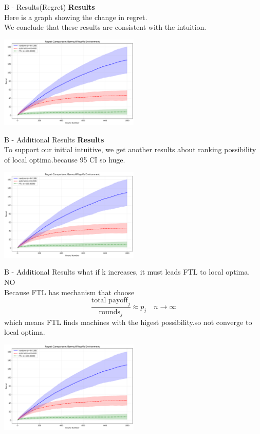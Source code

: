 \documentclass{beamer}
\begin{document}
\begin{frame}{B - Results(Regret)}
\textbf{Results}\\
Here is a graph showing the change in regret. \\
We conclude that these results are consistent with the intuition. \\
\begin{center}
    \includegraphics[width=0.5\textwidth]{332Project2/figures/bernoulli_regret_comparison.png}
\end{center}
\end{frame}

\begin{frame}{B - Additional Results}
\textbf{Results}\\
To support our initial intuitive, we get another results about ranking
possibility of local optima.because 95 CI so huge.
\begin{center}
    \includegraphics[width=0.5\textwidth]{332Project2/figures/bernoulli_regret_comparison.png}
\end{center}
\end{frame}

\begin{frame}{B - Additional Results}
what if k increases, it must leads FTL to local optima.  NO\\
Because FTL has mechanism that choose 
\[
\frac{\text{total payoff}_j}{\text{rounds}_j} \approx p_j \quad n \rightarrow\infty
\]
which means FTL finds machines with the higest possibility.so not converge to local optima.
\begin{center}
    \includegraphics[width=0.5\textwidth]{332Project2/figures/bernoulli_regret_comparison.png}
\end{center}
\end{frame}
\end{document}
